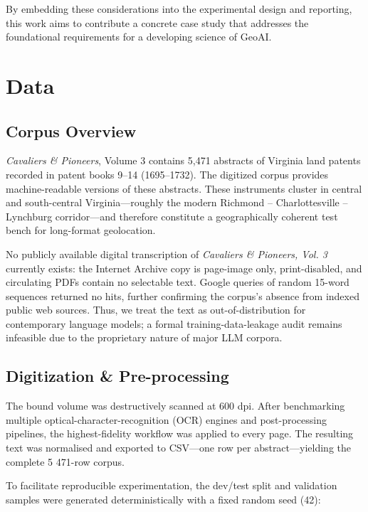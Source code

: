 By embedding these considerations into the experimental design and
reporting, this work aims to contribute a concrete case study that
addresses the foundational requirements for a developing science of
GeoAI.

\section{Data}\label{data}

\subsection{Corpus Overview}\label{corpus-overview}

\emph{Cavaliers \& Pioneers}, Volume 3 \citep{Nugent1979_cavaliers3}
contains 5,471 abstracts of Virginia land patents recorded in patent
books 9--14 (1695--1732). The digitized corpus
\citep{mioduski_2025_cvp3} provides machine-readable versions of these
abstracts. These instruments cluster in central and south-central
Virginia---roughly the modern Richmond -- Charlottesville -- Lynchburg
corridor---and therefore constitute a geographically coherent test bench
for long-format geolocation.

No publicly available digital transcription of \emph{Cavaliers \&
Pioneers, Vol. 3} currently exists: the Internet Archive copy is
page-image only, print-disabled, and circulating PDFs contain no
selectable text. Google queries of random 15-word sequences returned no
hits, further confirming the corpus's absence from indexed public web
sources. Thus, we treat the text as out-of-distribution for contemporary
language models; a formal training-data-leakage audit remains infeasible
due to the proprietary nature of major LLM corpora.

\subsection{Digitization \&
Pre-processing}\label{digitization-pre-processing}

The bound volume was destructively scanned at 600 dpi. After
benchmarking multiple optical-character-recognition (OCR) engines and
post-processing pipelines, the highest-fidelity workflow was applied to
every page. The resulting text was normalised and exported to CSV---one
row per abstract---yielding the complete 5 471-row corpus.

To facilitate reproducible experimentation, the dev/test split and
validation samples were generated deterministically with a fixed random
seed (42):

